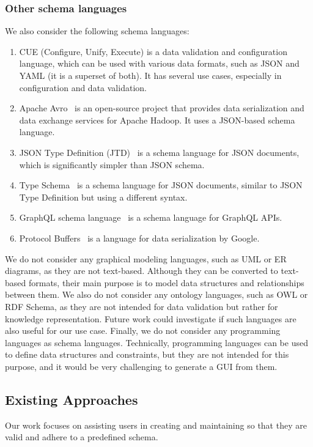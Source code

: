 \subsubsection{Other schema languages} %
We also consider the following schema languages:
\begin{enumerate}[label=(\alph*)]
    \item CUE (Configure, Unify, Execute)\cite{cuelang} is a data validation and configuration language, which can be used with various data formats, such as JSON and YAML (it is a superset of both).
    It has several use cases, especially in configuration and data validation.
    \item Apache Avro~\cite{Apache-Avro} is an open-source project that provides data serialization and data exchange services for Apache Hadoop.
    It uses a JSON-based schema language.
    \item JSON Type Definition (JTD)~\cite{rfc8927} is a schema language for JSON documents, which is significantly simpler than JSON schema.
    \item Type Schema~\cite{Kappestein_2023} is a schema language for JSON documents, similar to JSON Type Definition but using a different syntax.
    \item GraphQL schema language~\cite{graphQL} is a schema language for GraphQL APIs.
    \item Protocol Buffers~\cite{protobufProtocolBuffers} is a language for data serialization by Google.
\end{enumerate}

We do not consider any graphical modeling languages, such as UML or ER diagrams, as they are not text-based.
Although they can be converted to text-based formats, their main purpose is to model data structures and relationships between them.
We also do not consider any ontology languages, such as OWL or RDF Schema, as they are not intended for data validation but rather for knowledge representation.
Future work could investigate if such languages are also useful for our use case.
Finally, we do not consider any programming languages as schema languages.
Technically, programming languages can be used to define data structures and constraints, but they are not intended for this purpose, and it would be very challenging to generate a GUI from them.

\subsection{Existing Approaches}\label{subsec:existing-approaches}
Our work focuses on assisting users in creating and maintaining \cfgfiles{} so that they are valid and adhere to a predefined schema.

